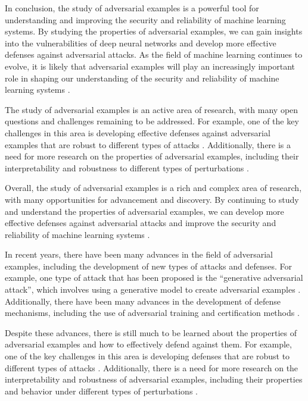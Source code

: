 \documentclass[11pt]{article}
\begin{document}
In conclusion, the study of adversarial examples is a powerful tool for understanding and improving the security and reliability of machine learning systems. By studying the properties of adversarial examples, we can gain insights into the vulnerabilities of deep neural networks and develop more effective defenses against adversarial attacks. As the field of machine learning continues to evolve, it is likely that adversarial examples will play an increasingly important role in shaping our understanding of the security and reliability of machine learning systems \cite{ref29}.

The study of adversarial examples is an active area of research, with many open questions and challenges remaining to be addressed. For example, one of the key challenges in this area is developing effective defenses against adversarial examples that are robust to different types of attacks \cite{ref30}. Additionally, there is a need for more research on the properties of adversarial examples, including their interpretability and robustness to different types of perturbations \cite{ref23}.

Overall, the study of adversarial examples is a rich and complex area of research, with many opportunities for advancement and discovery. By continuing to study and understand the properties of adversarial examples, we can develop more effective defenses against adversarial attacks and improve the security and reliability of machine learning systems \cite{ref31}.

In recent years, there have been many advances in the field of adversarial examples, including the development of new types of attacks and defenses. For example, one type of attack that has been proposed is the ``generative adversarial attack'', which involves using a generative model to create adversarial examples \cite{ref32}. Additionally, there have been many advances in the development of defense mechanisms, including the use of adversarial training and certification methods \cite{ref26}.

Despite these advances, there is still much to be learned about the properties of adversarial examples and how to effectively defend against them. For example, one of the key challenges in this area is developing defenses that are robust to different types of attacks \cite{ref30}. Additionally, there is a need for more research on the interpretability and robustness of adversarial examples, including their properties and behavior under different types of perturbations \cite{ref23}.
\end{document}
